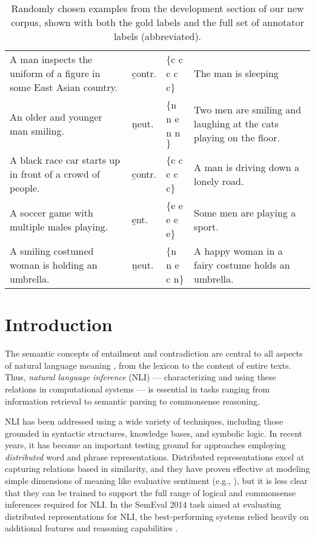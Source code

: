 \begin{table*}[t]
  \centering\footnotesize
  \begin{tabular}{p{6cm}p{0.75cm}p{1.4cm}p{6cm}}
  \toprule
A man inspects the uniform of a figure in some East Asian country. & \b{contr.}& \t{$\{$c c c c c$\}$} & The man is sleeping\\
\rule{0pt}{3ex}An older and younger man smiling. & \b{neut.}& \t{$\{$n n e n n$\}$} & Two men are smiling and laughing at the cats playing on the floor.\\
\rule{0pt}{3ex}A black race car starts up in front of a crowd of people. & \b{contr.}& \t{$\{$c c c c c$\}$} & A man is driving down a lonely road.\\
\rule{0pt}{3ex}A soccer game with multiple males playing. & \b{ent.}& \t{$\{$e e e e e$\}$} & Some men are playing a sport.\\
\rule{0pt}{3ex}A smiling costumed woman is holding an umbrella. & \b{neut.}& \t{$\{$n n e c n$\}$} & A happy woman in a fairy costume holds an umbrella.\\
    \bottomrule
  \end{tabular}
  \caption{\label{snli-examples}Randomly chosen examples from the development section of our new corpus, shown with both the gold labels and the full set of annotator labels (abbreviated).}
\end{table*}

\section{Introduction}\label{sec:introduction}

The semantic concepts of entailment and contradiction are central to
all aspects of natural language meaning
\cite{Katz72,vanBenthem08NATLOG}, from the lexicon to the content of
entire texts. Thus, \emph{natural language
  inference} (NLI) --- characterizing and using these relations in
computational systems
\cite{dagan2006pascal,MacCartney09,maccartney2009extended} --- is
essential in tasks ranging from information retrieval to semantic
parsing to commonsense reasoning.

NLI has been addressed using a wide variety of techniques, including
those grounded in syntactic structures, knowledge bases, and symbolic
logic. In recent years, it has become an important testing ground for
approaches employing \emph{distributed} word and phrase
representations. Distributed representations excel at capturing
relations based in similarity, and they have proven effective at
modeling simple dimensions of meaning like evaluative sentiment
(e.g., \citealt{socher2013recursive}), but it is less clear that they can be
trained to support the full range of logical and commonsense
inferences required for NLI. In the SemEval 2014 task aimed at evaluating distributed
representations for NLI, the best-performing systems relied heavily on
additional features and reasoning capabilities
\cite{marelli2014semeval}. 

